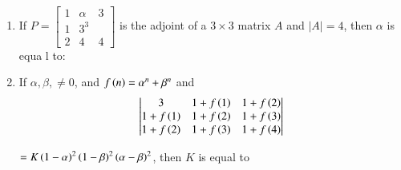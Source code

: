 \documentclass[journal,12pt,twocolumn]{IEEEtran}
\theoremstyle{remark}
\begin{document}
\begin{enumerate}
 	\item If $P = \begin{bmatrix}1&\alpha&3\\1&3^3\\2&4&4\end{bmatrix}$ is the adjoint of a $3\times3$ matrix $A$ and $|A| = 4$, then $\alpha$ is equa l to:
	\hfill{}
        \begin{enumerate}[label={(\alph*)}]
        \end{enumerate}

	\item If $\alpha,\beta,\neq 0$, and $f\left(n\right) = \alpha^n + \beta^n$ and
		\newline
		\begin{align*}
			\begin{vmatrix}
				3 & 1+f\left(1\right) & 1+f\left(2\right)\\
				1+f\left(1\right) & 1+f\left(2\right) & 1+f\left(3\right)\\
				1+f\left(2\right) & 1+f\left(3\right) & 1+f\left(4\right)
			\end{vmatrix}
		\end{align*}

		$=K\left(1-\alpha\right)^2\left(1-\beta\right)^2\left(\alpha-\beta\right)^2$,
		then $K$ is equal to

	\hfill{}
        \begin{enumerate}[label={(\alph*)}]
        \end{enumerate}



\end{enumerate}
\end{document}
